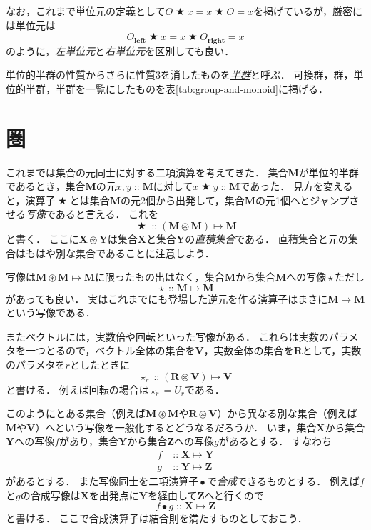 \documentclass[twocolumn]{jsbook}
\newcommand{\keyword}[1]{\underline{\emph{#1}}}
\newcommand{\mathKeyword}[1]{\mathbf{#1}}
\DeclareMathOperator{\mathAnyBinaryOperator}{\bigstar}
\DeclareMathOperator{\mathAnyUnaryOperator}{\star}
\DeclareMathOperator{\mathCompose}{\bullet}
\DeclareMathOperator{\mathIn}{::}
\DeclareMathOperator{\mathMapsTo}{\mapsto}
\DeclareMathOperator{\mathSetTimes}{\circledast}
\newcommand{\mathLeft}{\mathKeyword{left}}
\newcommand{\mathRight}{\mathKeyword{right}}
\newcommand{\mathSet}[1]{\mathbf{#1}}
\newcommand{\mathMorph}[2]{#1\mathMapsTo#2}
\begin{document}
なお，これまで単位元の定義として$O\mathAnyBinaryOperator x=x\mathAnyBinaryOperator O=x$を掲げているが，厳密には単位元は$$O_\mathLeft\mathAnyBinaryOperator x=x\mathAnyBinaryOperator O_\mathRight=x$$のように，\keyword{左単位元}と\keyword{右単位元}を区別しても良い．

単位的半群の性質からさらに性質3を消したものを\keyword{半群}と呼ぶ．
可換群，群，単位的半群，半群を一覧にしたものを表\ref{tab:group-and-monoid}に掲げる．

\section{圏}

これまでは集合の元同士に対する二項演算を考えてきた．
集合$\mathSet{M}$が単位的半群であるとき，集合$\mathSet{M}$の元$x,y\mathIn\mathSet{M}$に対して$x\mathAnyBinaryOperator y\mathIn\mathSet{M}$であった．
見方を変えると，演算子$\mathAnyBinaryOperator$とは集合$\mathSet{M}$の元2個から出発して，集合$\mathSet{M}$の元1個へとジャンプさせる\keyword{写像}であると言える．
これを$$\mathAnyBinaryOperator\mathIn{}\mathMorph{(\mathSet{M}\mathSetTimes\mathSet{M})}{\mathSet{M}}$$と書く．
ここに$\mathSet{X}\mathSetTimes\mathSet{Y}$は集合$\mathSet{X}$と集合$\mathSet{Y}$の\keyword{直積集合}である．
直積集合と元の集合はもはや別な集合であることに注意しよう．

写像は$\mathMorph{\mathSet{M}\mathSetTimes\mathSet{M}}{\mathSet{M}}$に限ったもの出はなく，集合$\mathSet{M}$から集合$\mathSet{M}$への写像$\mathAnyUnaryOperator$ただし$$\mathAnyUnaryOperator\mathIn\mathMorph{\mathSet{M}}{\mathSet{M}}$$があっても良い．
実はこれまでにも登場した逆元を作る演算子はまさに$\mathMorph{\mathSet{M}}{\mathSet{M}}$という写像である．

またベクトルには，実数倍や回転といった写像がある．
これらは実数のパラメタを一つとるので，ベクトル全体の集合を$\mathSet{V}$，実数全体の集合を$\mathSet{R}$として，実数のパラメタを$r$としたときに$$\mathAnyUnaryOperator_r\mathIn{}\mathMorph{(\mathSet{R}\mathSetTimes\mathSet{V})}{\mathSet{V}}$$と書ける．
例えば回転の場合は$\mathAnyUnaryOperator_r=U_r$である．

このようにとある集合（例えば$\mathSet{M}\mathSetTimes\mathSet{M}$や$\mathSet{R}\mathSetTimes\mathSet{V}$）から異なる別な集合（例えば$\mathSet{M}$や$\mathSet{V}$）へという写像を一般化するとどうなるだろうか．
いま，集合$\mathSet{X}$から集合$\mathSet{Y}$への写像$f$があり，集合$\mathSet{Y}$から集合$\mathSet{Z}$への写像$g$があるとする．
すなわち
\begin{align*}
f&\mathIn\mathMorph{\mathSet{X}}{\mathSet{Y}}\\
g&\mathIn\mathMorph{\mathSet{Y}}{\mathSet{Z}}
\end{align*}
があるとする．
また写像同士を二項演算子$\mathCompose$で\keyword{合成}できるものとする．
例えば$f$と$g$の合成写像は$\mathSet{X}$を出発点に$\mathSet{Y}$を経由して$\mathSet{Z}$へと行くので$$f\mathCompose g\mathIn\mathMorph{\mathSet{X}}{\mathSet{Z}}$$と書ける．
ここで合成演算子は結合則を満たすものとしておこう．
\end{document}
